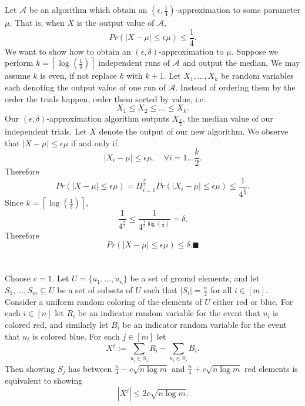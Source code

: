 \documentclass[letterpaper,12pt,oneside,onecolumn]{article}
\newcommand{\cA}{\mathcal{A}} \newcommand{\cB}{\mathcal{B}}
\newcommand{\ceil}[1]{\ensuremath{\left\lceil#1\right\rceil}}
\begin{document}
\section{}
\paragraph{}
Let $\cA$ be an algorithm which obtain an $(\epsilon, \frac{1}{4})$-approximation to some parameter $\mu$. That is, when $X$ is the output value of $\cA$,
$$Pr(|X - \mu| \leq \epsilon\mu) \leq \frac{1}{4}.$$
We want to show how to obtain an $(\epsilon,\delta)$-approximation to $\mu$. Suppose we perform $k = \ceil{\log(\frac{1}{\delta})}$ independent runs of $\cA$ and output the median. We may assume $k$ is even, if not replace $k$ with $k+1$. Let $X_1, \dots, X_k$ be random variables each denoting the output value of one run of $\cA$. Instead of ordering them by the order the trials happen, order them sorted by value, i.e.
$$X_1 \leq X_2 \leq \dots\leq X_k.$$
Our $(\epsilon,\delta)$-approximation algorithm outputs $X_\frac{k}{2}$, the median value of our independent trials. Let $X$ denote the output of our new algorithm. We observe that $|X - \mu|\leq \epsilon \mu$ if and only if 
$$|X_i - \mu | \leq \epsilon \mu, \quad \forall i=1 \dots \frac{k}{2}.$$
Therefore
$$Pr(|X-\mu| \leq \epsilon \mu) = \Pi_{i=1}^\frac{k}{2} Pr(|X_i - \mu| \leq \epsilon \mu) \leq \frac{1}{4^\frac{k}{2}}.$$
Since $k = \ceil{\log(\frac{1}{\delta})}$,
$$\frac{1}{4^\frac{k}{2}} \leq \frac{1}{4^{\frac{1}{2}\log(\frac{1}{\delta})}} = \delta.$$
Therefore
$$Pr(|X-\mu| \leq \epsilon \mu) \leq \delta. \blacksquare$$
\newpage
\section{}
\paragraph{}
Choose $c = 1$. Let $U = \{u_1,\dots, u_n\}$ be a set of ground elements, and let $S_1, \dots, S_m \subseteq U$ be a set of subsets of $U$ such that $|S_i| = \frac{n}{2}$ for all $i\in [m]$. Consider a uniform random coloring of the elements of $U$ either red or blue. For each $i \in [n]$ let $R_i$ be an indicator random variable for the event that $u_i$ is colored red, and similarly let $B_i$ be an indicator random variable for the event that $u_i$ is colored blue. For each $j \in [m]$ let $$X^j := \sum_{u_i \in S_j} R_i - \sum_{u_i \in S_j} B_i.$$
Then showing $S_j$ has between $\frac{n}{4} - c\sqrt{n\log m}$ and $\frac{n}{4} +c\sqrt{n\log m}$ red elements is equivalent to showing $$|X^j| \leq 2c\sqrt{n\log m}.$$
\end{document}
